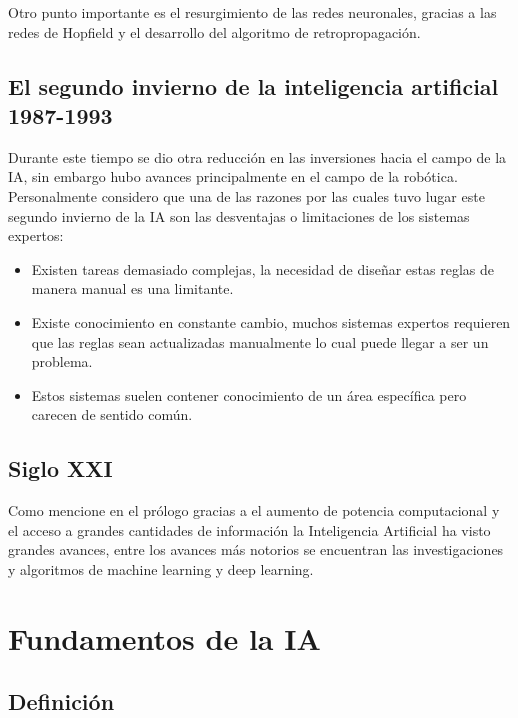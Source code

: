 \documentclass[11pt,fleqn]{book} %
\begin{document}
Otro punto importante es el resurgimiento de las redes neuronales, gracias a las redes de Hopfield y el desarrollo del algoritmo de retropropagación.

\section{El segundo invierno de la inteligencia artificial 1987-1993} 

Durante este tiempo se dio otra reducción en las inversiones hacia el campo de la IA, sin embargo hubo avances principalmente en el campo de la robótica. Personalmente considero que una de las razones por las cuales tuvo lugar este segundo invierno de la IA son las desventajas o limitaciones de los sistemas expertos:

\begin{itemize}
\item Existen tareas demasiado complejas, la necesidad de diseñar estas reglas de manera manual es una limitante.
\item Existe conocimiento en constante cambio, muchos sistemas expertos requieren que las reglas sean actualizadas manualmente lo cual puede llegar a ser un problema.
\item Estos sistemas suelen contener conocimiento de un área específica pero carecen de sentido común. 
\end{itemize}

\section{Siglo XXI} 

Como mencione en el prólogo gracias a el aumento de potencia computacional y el acceso a grandes cantidades de información la Inteligencia Artificial ha visto grandes avances, entre los avances más notorios se encuentran las investigaciones y algoritmos de machine learning y deep learning.


\chapter{Fundamentos de la IA}

\section{Definición} 
\end{document}
